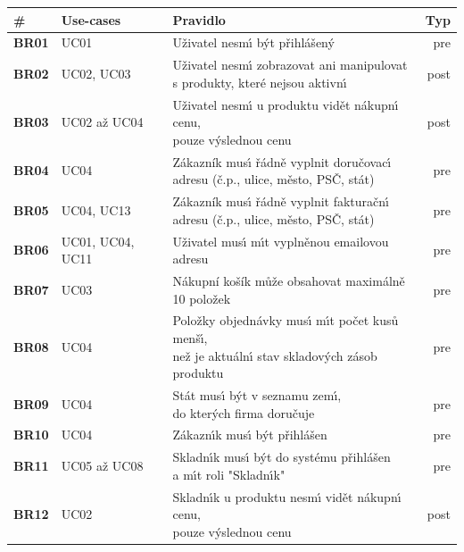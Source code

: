 \begin{table}
    \centering
    \begin{tabular}{ l l l r }
        \hline
        \textbf{\#} & \textbf{Use-cases} & \textbf{Pravidlo} & \textbf{Typ} \\ \hline \hline
        \textbf{BR01} & UC01 & Uživatel nesm\'{\i} b\'yt přihlášen\'y & pre \\ \hline
        \textbf{BR02} & UC02, UC03 & \makecell[l]{Uživatel nesm\'{\i} zobrazovat ani manipulovat \\ s produkty, které nejsou aktivn\'{\i}} & post \\ \hline
        \textbf{BR03} & UC02 až UC04 & \makecell[l]{Uživatel nesm\'{\i} u produktu vidět nákupn\'{\i} cenu, \\ pouze v\'yslednou cenu} & post \\ \hline
        \textbf{BR04} & UC04 & \makecell[l]{Zákazník mus\'{\i} řádně vyplnit doručovac\'{\i} \\ adresu (č.p., ulice, město, PSČ, stát)} & pre \\ \hline
        \textbf{BR05} & UC04, UC13 & \makecell[l]{Zákazník mus\'{\i} řádně vyplnit fakturačn\'{\i} \\ adresu (č.p., ulice, město, PSČ, stát)} & pre \\ \hline
        \textbf{BR06} & UC01, UC04, UC11 & Uživatel mus\'{\i} m\'{\i}t vyplněnou emailovou adresu & pre \\ \hline
        \textbf{BR07} & UC03 & \makecell[l]{Nákupní košík může obsahovat maximálně \\ 10 položek} & pre \\ \hline
        \textbf{BR08} & UC04 & \makecell[l]{Položky objednávky mus\'{\i} m\'{\i}t počet kusů menš\'{\i}, \\ než je aktuáln\'{\i} stav skladov\'ych zásob produktu} & pre \\ \hline
        \textbf{BR09} & UC04 & \makecell[l]{Stát mus\'{\i} b\'yt v seznamu zem\'{\i}, \\ do kter\'ych firma doručuje} & pre \\ \hline
        \textbf{BR10} & UC04 & Zákazn\'{\i}k mus\'{\i} b\'yt přihlášen & pre \\ \hline
        \textbf{BR11} & UC05 až UC08 & \makecell[l]{Skladn\'{\i}k mus\'{\i} b\'yt do systému přihlášen \\ a m\'{\i}t roli "Skladn\'{\i}k"} & pre \\ \hline
        \textbf{BR12} & UC02 & \makecell[l]{Skladn\'{\i}k u produktu nesm\'{\i} vidět nákupn\'{\i} cenu, \\ pouze v\'yslednou cenu} & post \\ \hline

\end{tabular}
\end{table}
